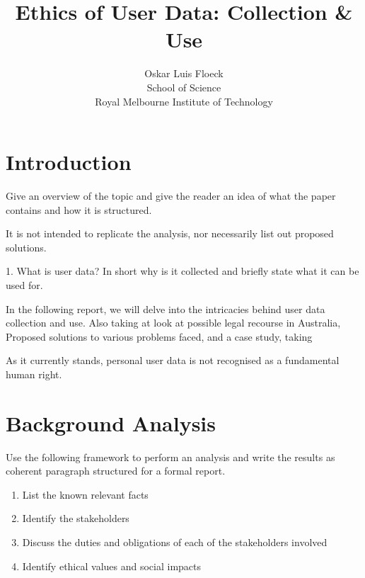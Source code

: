 \documentclass[12pt,a4paper]{article}
\begin{document}
\title{Ethics of User Data: Collection \& Use}

\author{
Oskar Luis Floeck\\
School of Science\\
Royal Melbourne Institute of Technology}

\maketitle



\section{Introduction}

Give an overview of the topic and 
give the reader an idea of what the paper contains and how it is structured. 

It is not intended to replicate the analysis, nor necessarily list out proposed solutions.


1. What is user data? In short why is it collected and briefly state what it can be used for.

In the following report, we will delve into the intricacies behind user data collection and use. Also taking at look at possible legal recourse in Australia, Proposed solutions to various problems faced, and a case study, taking 


As it currently stands, personal user data is not recognised as a fundamental human right. 




\section{Background Analysis}

Use the following framework to perform an analysis and write the results as coherent paragraph structured for a formal report.

\begin{enumerate}
	\item List the known relevant facts
	\item Identify the stakeholders
	\item Discuss the duties and obligations of each of the stakeholders involved
	\item Identify ethical values and social impacts
\end{enumerate}
\end{document}
